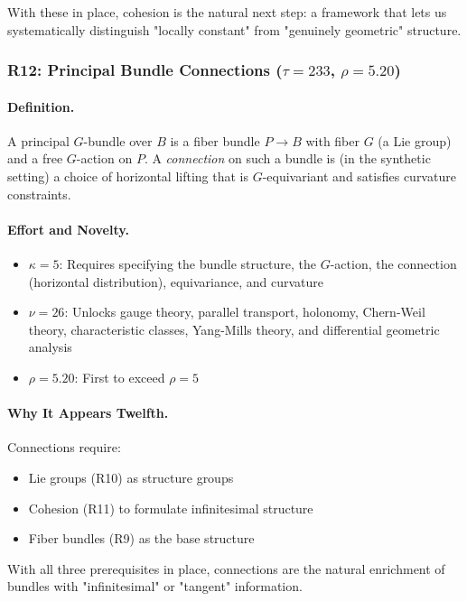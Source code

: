\documentclass[11pt]{article}
\theoremstyle{definition}
\begin{document}
With these in place, cohesion is the natural next step: a framework that lets us systematically distinguish "locally constant" from "genuinely geometric" structure.

\subsubsection{R12: Principal Bundle Connections ($\tau=233$, $\rho=5.20$)}

\paragraph{Definition.}
A principal $G$-bundle over $B$ is a fiber bundle $P \to B$ with fiber $G$ (a Lie group) and a free $G$-action on $P$. A \emph{connection} on such a bundle is (in the synthetic setting) a choice of horizontal lifting that is $G$-equivariant and satisfies curvature constraints.

\paragraph{Effort and Novelty.}
\begin{itemize}
\item $\kappa = 5$: Requires specifying the bundle structure, the $G$-action, the connection (horizontal distribution), equivariance, and curvature
\item $\nu = 26$: Unlocks gauge theory, parallel transport, holonomy, Chern-Weil theory, characteristic classes, Yang-Mills theory, and differential geometric analysis
\item $\rho = 5.20$: First to exceed $\rho=5$
\end{itemize}

\paragraph{Why It Appears Twelfth.}
Connections require:
\begin{itemize}
\item Lie groups (R10) as structure groups
\item Cohesion (R11) to formulate infinitesimal structure
\item Fiber bundles (R9) as the base structure
\end{itemize}

With all three prerequisites in place, connections are the natural enrichment of bundles with "infinitesimal" or "tangent" information.
\end{document}
